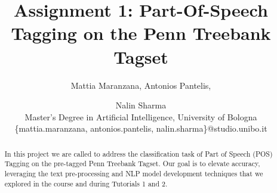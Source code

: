 \documentclass[11pt]{article}
\begin{document}
%
\title{Assignment 1: Part-Of-Speech Tagging on the Penn Treebank Tagset}

\author{Mattia Maranzana,
Antonios Pantelis,
\and
Nalin Sharma\\
Master's Degree in Artificial Intelligence, University of Bologna\\
\{mattia.maranzana, antonios.pantelis, nalin.sharma\}@studio.unibo.it
}
\maketitle

\begin{abstract}
In this project we are called to address the classification task of Part of Speech (POS) Tagging on the pre-tagged Penn Treebank Tagset. Our goal is to elevate accuracy, leveraging the text pre-processing and NLP model development techniques that we explored in the course and during Tutorials 1 and 2.
\end{abstract}

\end{document}
